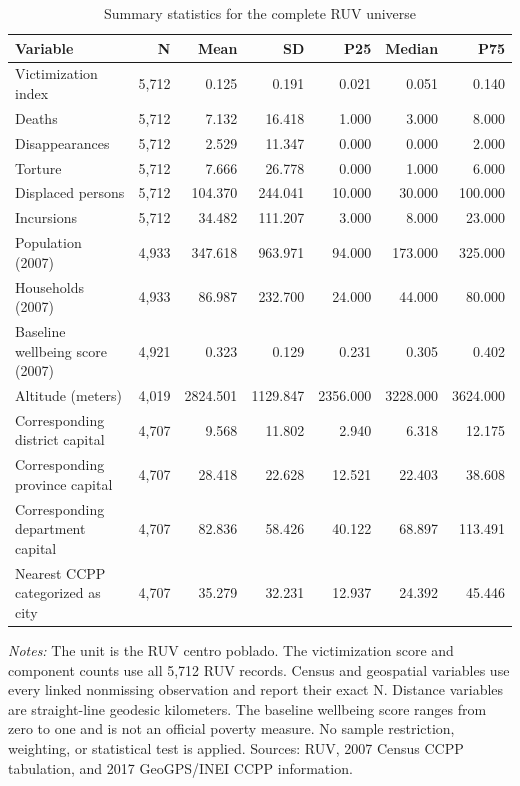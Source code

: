 \begin{table}[!htbp]
\centering
\caption{Summary statistics for the complete RUV universe}
\label{tab:desc_summary_statistics}
\begin{tabular}{lrrrrrr}
\toprule
Variable & N & Mean & SD & P25 & Median & P75 \\
\midrule
Victimization index & 5,712 & 0.125 & 0.191 & 0.021 & 0.051 & 0.140 \\
Deaths & 5,712 & 7.132 & 16.418 & 1.000 & 3.000 & 8.000 \\
Disappearances & 5,712 & 2.529 & 11.347 & 0.000 & 0.000 & 2.000 \\
Torture & 5,712 & 7.666 & 26.778 & 0.000 & 1.000 & 6.000 \\
Displaced persons & 5,712 & 104.370 & 244.041 & 10.000 & 30.000 & 100.000 \\
Incursions & 5,712 & 34.482 & 111.207 & 3.000 & 8.000 & 23.000 \\
Population (2007) & 4,933 & 347.618 & 963.971 & 94.000 & 173.000 & 325.000 \\
Households (2007) & 4,933 & 86.987 & 232.700 & 24.000 & 44.000 & 80.000 \\
Baseline wellbeing score (2007) & 4,921 & 0.323 & 0.129 & 0.231 & 0.305 & 0.402 \\
Altitude (meters) & 4,019 & 2824.501 & 1129.847 & 2356.000 & 3228.000 & 3624.000 \\
Corresponding district capital & 4,707 & 9.568 & 11.802 & 2.940 & 6.318 & 12.175 \\
Corresponding province capital & 4,707 & 28.418 & 22.628 & 12.521 & 22.403 & 38.608 \\
Corresponding department capital & 4,707 & 82.836 & 58.426 & 40.122 & 68.897 & 113.491 \\
Nearest CCPP categorized as city & 4,707 & 35.279 & 32.231 & 12.937 & 24.392 & 45.446 \\
\bottomrule
\end{tabular}
\parbox{0.98\linewidth}{\footnotesize \textit{Notes:} The unit is the RUV centro poblado. The victimization score and component counts use all 5,712 RUV records. Census and geospatial variables use every linked nonmissing observation and report their exact N. Distance variables are straight-line geodesic kilometers. The baseline wellbeing score ranges from zero to one and is not an official poverty measure. No sample restriction, weighting, or statistical test is applied. Sources: RUV, 2007 Census CCPP tabulation, and 2017 GeoGPS/INEI CCPP information.}
\end{table}
